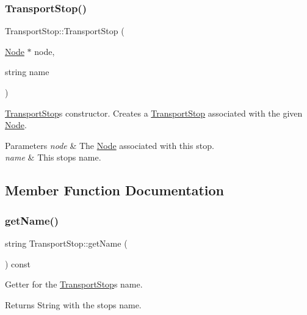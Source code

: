 \subsubsection{\texorpdfstring{Transport\+Stop()}{TransportStop()}}
{\footnotesize\ttfamily Transport\+Stop\+::\+Transport\+Stop (\begin{DoxyParamCaption}\item[{\hyperlink{class_node}{Node} $\ast$}]{node,  }\item[{string}]{name }\end{DoxyParamCaption})}

\hyperlink{class_transport_stop}{Transport\+Stop}\textquotesingle{}s constructor. Creates a \hyperlink{class_transport_stop}{Transport\+Stop} associated with the given \hyperlink{class_node}{Node}.


\begin{DoxyParams}{Parameters}
{\em node} & The \hyperlink{class_node}{Node} associated with this stop. \\
\hline
{\em name} & This stop\textquotesingle{}s name. \\
\hline
\end{DoxyParams}


\subsection{Member Function Documentation}
\hypertarget{class_transport_stop_ac4e1999cbad5b9d6e25c9abee0649064}{}\label{class_transport_stop_ac4e1999cbad5b9d6e25c9abee0649064} 
\subsubsection{\texorpdfstring{get\+Name()}{getName()}}
{\footnotesize\ttfamily string Transport\+Stop\+::get\+Name (\begin{DoxyParamCaption}{ }\end{DoxyParamCaption}) const}

Getter for the \hyperlink{class_transport_stop}{Transport\+Stop}\textquotesingle{}s name.

\begin{DoxyReturn}{Returns}
String with the stop\textquotesingle{}s name. 
\end{DoxyReturn}
\hypertarget{class_transport_stop_ab38b14d8cfac1949ac8f853fdf8620bc}{}\label{class_transport_stop_ab38b14d8cfac1949ac8f853fdf8620bc} 
